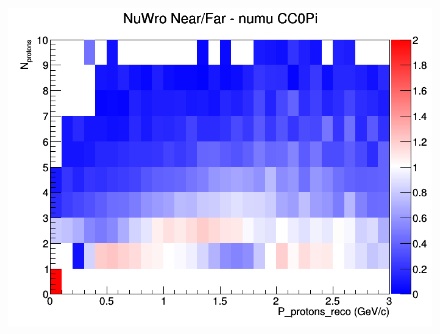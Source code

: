 \begin{figure}[h]
\endminipage
{}
\includegraphics[width=\linewidth]{eff_N_P/FGT/protons/ratios/CC0Pi_NuWro_numu_NF_N_P.png}
\endminipage
\newline
\end{figure}
\clearpage
